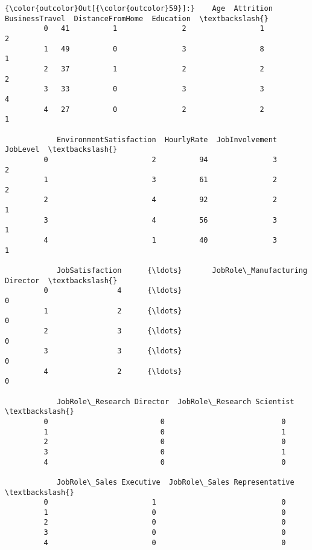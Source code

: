 \documentclass[11pt]{article}
\begin{document}
\begin{Verbatim}[commandchars=\\\{\}]
{\color{outcolor}Out[{\color{outcolor}59}]:}    Age  Attrition  BusinessTravel  DistanceFromHome  Education  \textbackslash{}
         0   41          1               2                 1          2   
         1   49          0               3                 8          1   
         2   37          1               2                 2          2   
         3   33          0               3                 3          4   
         4   27          0               2                 2          1   
         
            EnvironmentSatisfaction  HourlyRate  JobInvolvement  JobLevel  \textbackslash{}
         0                        2          94               3         2   
         1                        3          61               2         2   
         2                        4          92               2         1   
         3                        4          56               3         1   
         4                        1          40               3         1   
         
            JobSatisfaction      {\ldots}       JobRole\_Manufacturing Director  \textbackslash{}
         0                4      {\ldots}                                    0   
         1                2      {\ldots}                                    0   
         2                3      {\ldots}                                    0   
         3                3      {\ldots}                                    0   
         4                2      {\ldots}                                    0   
         
            JobRole\_Research Director  JobRole\_Research Scientist  \textbackslash{}
         0                          0                           0   
         1                          0                           1   
         2                          0                           0   
         3                          0                           1   
         4                          0                           0   
         
            JobRole\_Sales Executive  JobRole\_Sales Representative  \textbackslash{}
         0                        1                             0   
         1                        0                             0   
         2                        0                             0   
         3                        0                             0   
         4                        0                             0   
         

\end{Verbatim}
\end{document}
